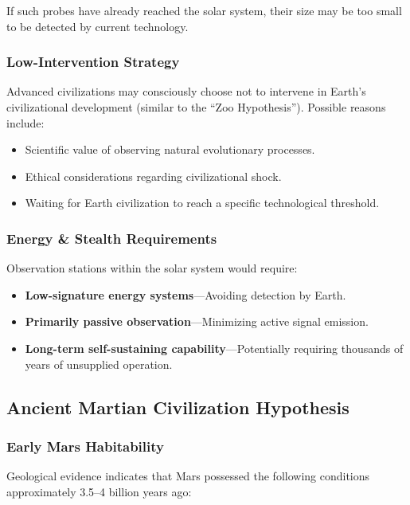 \documentclass[aps,prd,twocolumn,superscriptaddress,nofootinbib]{revtex4-2}
\begin{document}
If such probes have already reached the solar system, their size may be too small to be detected by current technology.

\subsubsection{Low-Intervention Strategy}\label{sec:zoo-hypothesis}

Advanced civilizations may consciously choose not to intervene in Earth's civilizational development (similar to the ``Zoo Hypothesis''). Possible reasons include:

\begin{itemize}
  \item Scientific value of observing natural evolutionary processes.
  \item Ethical considerations regarding civilizational shock.
  \item Waiting for Earth civilization to reach a specific technological threshold.
\end{itemize}

\subsubsection{Energy \& Stealth Requirements}\label{sec:observer-energy}

Observation stations within the solar system would require:

\begin{itemize}
  \item \textbf{Low-signature energy systems}---Avoiding detection by Earth.
  \item \textbf{Primarily passive observation}---Minimizing active signal emission.
  \item \textbf{Long-term self-sustaining capability}---Potentially requiring thousands of years of unsupplied operation.
\end{itemize}

\subsection{Ancient Martian Civilization Hypothesis}\label{sec:mars-civ}

\subsubsection{Early Mars Habitability}\label{sec:mars-habit}

Geological evidence indicates that Mars possessed the following conditions approximately 3.5--4 billion years ago:
\end{document}
